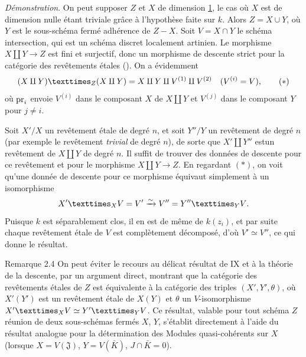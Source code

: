 \documentclass[10pt]{../fichiers-configuration-latex/smfart}
\begin{document}
\noindent
\emph{Démonstration}. On peut supposer $Z$ et $X$ de dimension
\hyperref[XIII.sec1]{1}, le 
cas où $X$ est de dimension nulle étant triviale grâce à l'hypothèse
faite sur $k$. Alors $Z=X\cup Y$, où $Y$ est le sous-schéma fermé
adhérence de $Z-X$. Soit $V=X\cap Y$ le schéma intersection, qui est
un schéma discret \ie localement artinien. Le morphisme $X\amalg
Y\rightarrow Z$ est fini et surjectif, donc un morphisme de descente
strict pour la catégorie des revêtements étales (\SGA {}). On a
évidemment
\begin{equation*}
\fprod{(X\amalg Y)}{(X\amalg Y)}{Z}=X\amalg Y\amalg V^{(1)}\amalg
V^{(2)}\quad (V^{(i)}=V){\quoi},\tag{$\ast$}
\end{equation*}
où $\operatorname{pr}_i$ envoie $V^{(i)}$ dans le composant $X$ de $X\amalg Y$ et
$V^{(j)}$ dans le composant $Y$ pour $j\neq i$.

Soit $X'/X$ un revêtement étale de degré $n$, et soit $Y''/Y$ un
revêtement de degré $n$ (par exemple le revêtement \emph{trivial} de
degré $n$), de sorte que $X'\amalg Y''$ est\pageoriginale un
revêtement de $X\amalg Y$ de degré $n$. Il suffit de trouver des
données de descente pour ce revêtement et pour le morphisme $X\amalg
Y\rightarrow Z$. En regardant $(\ast)$, on voit qu'une donnée de
descente pour ce morphisme équivaut simplement à un isomorphisme
$$
\fprod{X'}{V}{X}=V'\xrightarrow{\sim} V''=\fprod{Y''}{V}{Y}{\quoi}.
$$
Puisque $k$ est séparablement clos, il en est de même de $k(z_i)$, et
par suite chaque revêtement étale de $V$ est complètement décomposé,
d'où $V'\simeq V''$, ce qui donne le résultat.

\begin{enonce*}[remark]{Remarque 2.4}
On peut éviter le recours au délicat résultat de \SGA IX et à la
théorie de la descente, par un argument direct, montrant que la
catégorie des revêtements étales de $Z$ est équivalente à la catégorie
des triples $(X',Y',\theta)$, où $X'(Y')$ est un revêtement étale de
$X(Y)$ et $\theta$ un $V$-isomorphisme $\fprod{X'}{V}{X}\simeq
\fprod{Y'}{V}{Y}$. Ce résultat, valable pour tout schéma $Z$ réunion
de deux sous-schémas fermés $X$, $Y$, s'établit directement à l'aide
du résultat analogue pour la détermination des Modules quasi-cohérents
sur $X$ (lorsque $X=V(\mathfrak{J})$, $Y=V(\bar{K})$, $J\cap \bar{K}=0$).
\end{enonce*}

\end{document}
